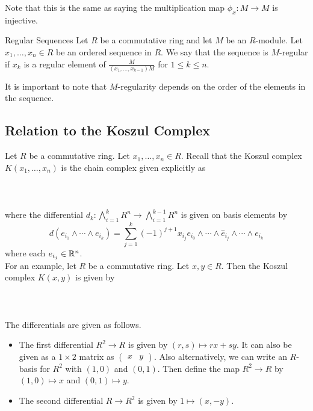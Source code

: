 \documentclass[a4paper]{article}
\begin{document}
Note that this is the same as saying the multiplication map $\phi_x:M\to M$ is injective. 

\begin{defn}{Regular Sequences}{} Let $R$ be a commutative ring and let $M$ be an $R$-module. Let $x_1,\dots,x_n\in R$ be an ordered sequence in $R$. We say that the sequence is $M$-regular if $x_k$ is a regular element of $\frac{M}{(x_1,\dots,x_{k-1})M}$ for $1\leq k\leq n$. 
\end{defn}

It is important to note that $M$-regularity depends on the order of the elements in the sequence. 

\subsection{Relation to the Koszul Complex}
Let $R$ be a commutative ring. Let $x_1,\dots,x_n\in R$. Recall that the Koszul complex $K(x_1,\dots,x_n)$ is the chain complex given explicitly as \\~\\
\\~\\
where the differential $d_k:\bigwedge_{i=1}^kR^n\to\bigwedge_{i=1}^{k-1}R^n$ is given on basis elements by $$d(e_{i_1}\wedge\cdots\wedge e_{i_k})=\sum_{j=1}^k(-1)^{j+1}x_{i_j}e_{i_0}\wedge\cdots\wedge\hat{e}_{i_j}\wedge\cdots\wedge e_{i_k}$$ where each $e_{i_j}\in\mathbb{R}^n$. \\

For an example, let $R$ be a commutative ring. Let $x,y\in R$. Then the Koszul complex $K(x,y)$ is given by \\~\\
\\~\\
The differentials are given as follows. 
\begin{itemize}
\item The first differential $R^2\to R$ is given by $(r,s)\mapsto rx+sy$. It can also be given as a $1\times 2$ matrix as $\begin{pmatrix}x & y\end{pmatrix}$. Also alternatively, we can write an $R$-basis for $R^2$ with $(1,0)$ and $(0,1)$. Then define the map $R^2\to R$ by $(1,0)\mapsto x$ and $(0,1)\mapsto y$. 
\item The second differential $R\to R^2$ is given by $1\mapsto(x,-y)$. 
\end{itemize}
\end{document}
